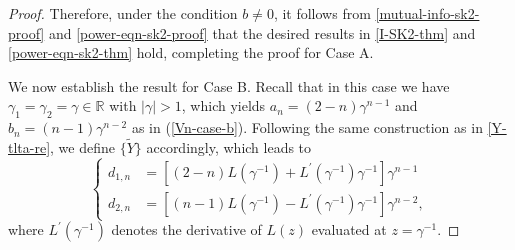 \documentclass[12pt]{article}
\begin{document}
\begin{proof}
Therefore, under the condition $b\neq 0$,  it follows from \eqref{mutual-info-sk2-proof} and \eqref{power-eqn-sk2-proof} that the desired results in \eqref{I-SK2-thm} and \eqref{power-eqn-sk2-thm} hold, completing the proof for Case A.




We now establish the result for Case B. Recall that in this case we have $\gamma_1=\gamma_2=\gamma\in \mathbb{R}$ with $|\gamma|>1$, which yields $a_n=(2-n)\gamma^{n-1}$ and $b_n=(n-1)\gamma^{n-2}$ as in (\ref{Vn-case-b}). Following the same construction as in \eqref{Y-tlta-re}, we define \(\{\widetilde{Y}\}\) accordingly, which leads to
\begin{equation*}\label{d12-case-c}
\left\{
\begin{aligned}
d_{1,n} &=\left[(2-n)L(\gamma^{-1})+L^\prime(\gamma^{-1})\gamma^{-1} \right]  \gamma^{n-1}\\[2pt]
d_{2,n} &= \left[(n-1)L(\gamma^{-1}) -L^\prime(\gamma^{-1})\gamma^{-1}   \right]\gamma^{n-2},
\end{aligned}
\right.
\end{equation*}
where $L^\prime(\gamma^{-1})$ denotes the derivative of $L(z)$ evaluated at $z = \gamma^{-1}$. 


\end{proof}
\end{document}
